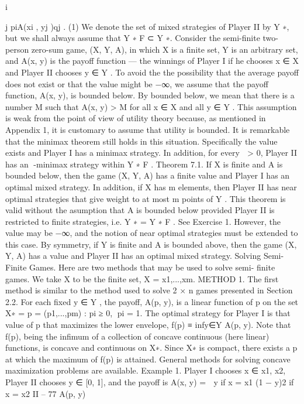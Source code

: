 i


j
piA(xi , yj )qj . (1)
We denote the set of mixed strategies of Player II by Y ∗, but we shall always assume that
Y ∗
F ⊂ Y ∗.
Consider the semi-finite two-person zero-sum game, (X, Y, A), in which X is a finite
set, Y is an arbitrary set, and A(x, y) is the payoff function — the winnings of Player I
if he chooses x ∈ X and Player II chooses y ∈ Y . To avoid the the possibility that the
average payoff does not exist or that the value might be −∞, we assume that the payoff
function, A(x, y), is bounded below. By bounded below, we mean that there is a number
M such that A(x, y) > M for all x ∈ X and all y ∈ Y . This assumption is weak from
the point of view of utility theory because, as mentioned in Appendix 1, it is customary
to assume that utility is bounded.
It is remarkable that the minimax theorem still holds in this situation. Specifically
the value exists and Player I has a minimax strategy. In addition, for every  > 0, Player
II has an -minimax strategy within Y ∗
F .
Theorem 7.1. If X is finite and A is bounded below, then the game (X, Y, A) has a finite
value and Player I has an optimal mixed strategy. In addition, if X has m elements, then
Player II has near optimal strategies that give weight to at most m points of Y .
This theorem is valid without the asumption that A is bounded below provided Player
II is restricted to finite strategies, i.e. Y ∗ = Y ∗
F . See Exercise 1. However, the value may
be −∞, and the notion of near optimal strategies must be extended to this case.
By symmetry, if Y is finite and A is bounded above, then the game (X, Y, A) has a
value and Player II has an optimal mixed strategy.
Solving Semi-Finite Games. Here are two methods that may be used to solve semi-
finite games. We take X to be the finite set, X = {x1,...,xm}.
METHOD 1. The first method is similar to the method used to solve 2 × n games
presented in Section 2.2. For each fixed y ∈ Y , the payoff, A(p, y), is a linear function of p
on the set X∗ = {p = (p1,...,pm) : pi ≥ 0,
pi = 1}. The optimal strategy for Player I is
that value of p that maximizes the lower envelope, f(p) ≡ infy∈Y A(p, y). Note that f(p),
being the infimum of a collection of concave continuous (here linear) functions, is concave
and continuous on X∗. Since X∗ is compact, there exists a p at which the maximum of f(p)
is attained. General methods for solving concave maximization problems are available.
Example 1. Player I chooses x ∈ {x1, x2}, Player II chooses y ∈ [0, 1], and the payoff
is
A(x, y) =  y if x = x1
(1 − y)2 if x = x2
II – 77
A(p, y)
